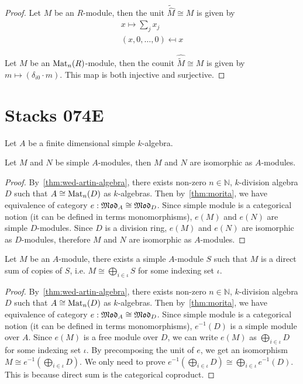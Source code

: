 \begin{proof}
  Let $M$ be an $R$-module, then the unit $\tilde{\hat{M}} \cong M$ is given by
  \[
    \begin{aligned}
      x \mapsto \sum_{j} x_{j} \\
      (x,0,\dots,0) \mapsfrom x
    \end{aligned}
  \]

  Let $M$ be an $\operatorname{Mat}_{n}(R)$-module, then the counit $\hat{\tilde{M}}\cong M$ is given by $m \mapsto (\delta_{i0}\cdot m)$. This map is both injective and surjective.
\end{proof}

\section{Stacks 074E}\label{sec:stacks-074e}

Let $A$ be a finite dimensional simple $k$-algebra.

\begin{lemma}
  Let $M$ and $N$ be simple $A$-modules, then $M$ and $N$ are isomorphic as $A$-modules.
  \leanok
\end{lemma}

\begin{proof}
  By~\cref{thm:wed-artin-algebra}, there exists non-zero $n\in\mathbb N$, $k$-division algebra $D$ such that $A\cong \operatorname{Mat}_{n}(D)$ as $k$-algebras. Then by~\cref{thm:morita}, we have equivalence of category $e : \operatorname{\mathfrak{Mod}}_{A}\cong\operatorname{\mathfrak{Mod}}_{D}$. Since simple module is a categorical notion (it can be defined in terms monomorphisms), $e(M)$ and $e(N)$ are simple $D$-modules. Since $D$ is a division ring, $e(M)$ and $e(N)$ are isomorphic as $D$-modules, therefore $M$ and $N$ are isomorphic as $A$-modules.
\end{proof}

\begin{lemma}
  Let $M$ be an $A$-module, there exists a simple $A$-module $S$ such that $M$ is a direct sum of copies of $S$, i.e. $M \cong \bigoplus_{i \in \iota} S$ for some indexing set $\iota$.
  \leanok
\end{lemma}

\begin{proof}
  By~\cref{thm:wed-artin-algebra}, there exists non-zero $n\in\mathbb N$, $k$-division algebra $D$ such that $A\cong \operatorname{Mat}_{n}(D)$ as $k$-algebras. Then by~\cref{thm:morita}, we have equivalence of category $e : \operatorname{\mathfrak{Mod}}_{A}\cong\operatorname{\mathfrak{Mod}}_{D}$. Since simple module is a categorical notion (it can be defined in terms monomorphisms), $e^{-1}(D)$ is a simple module over $A$. Since $e(M)$ is a free module over $D$, we can write $e(M)$ as $\bigoplus_{i\in \iota} D$ for some indexing set $\iota$. By precomposing the unit of $e$, we get an isomorphism $M \cong e^{-1}\left(\bigoplus_{i\in\iota} D\right)$. We only need to prove $e^{-1}\left(\bigoplus_{i\in\iota} D\right)\cong\bigoplus_{i\in\iota}e^{-1}\left(D\right)$. This is because direct sum is the categorical coproduct.
\end{proof}

